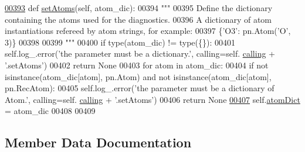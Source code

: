 \begin{DoxyCode}
\hypertarget{classpyneb_1_1core_1_1diags_1_1_diagnostics_l00393}{}\hyperlink{classpyneb_1_1core_1_1diags_1_1_diagnostics_a01ad01e336115e86eada60350060bb9b}{00393}     \textcolor{keyword}{def }\hyperlink{classpyneb_1_1core_1_1diags_1_1_diagnostics_a01ad01e336115e86eada60350060bb9b}{setAtoms}(self, atom\_dic):
00394         \textcolor{stringliteral}{"""}
00395 \textcolor{stringliteral}{        Define the dictionary containing the atoms used for the diagnostics.}
00396 \textcolor{stringliteral}{        A dictionary of atom instantiations refereed by atom strings, for example:}
00397 \textcolor{stringliteral}{        \{'O3': pn.Atom('O', 3)\}}
00398 \textcolor{stringliteral}{        }
00399 \textcolor{stringliteral}{        """}
00400         \textcolor{keywordflow}{if} type(atom\_dic) != type(\{\}):
00401             self.log\_.error(\textcolor{stringliteral}{'the parameter must be a dictionary.'}, calling=self.
      \hyperlink{classpyneb_1_1core_1_1diags_1_1_diagnostics_a07dce673fec8b2383ef411ab94b0b2fe}{calling} + \textcolor{stringliteral}{'.setAtoms'})
00402             \textcolor{keywordflow}{return} \textcolor{keywordtype}{None}
00403         \textcolor{keywordflow}{for} atom \textcolor{keywordflow}{in} atom\_dic:
00404             \textcolor{keywordflow}{if} \textcolor{keywordflow}{not} isinstance(atom\_dic[atom], pn.Atom) \textcolor{keywordflow}{and} \textcolor{keywordflow}{not} isinstance(atom\_dic[atom], pn.RecAtom):
00405                 self.log\_.error(\textcolor{stringliteral}{'the parameter must be a dictionary of Atom.'}, calling=self.
      \hyperlink{classpyneb_1_1core_1_1diags_1_1_diagnostics_a07dce673fec8b2383ef411ab94b0b2fe}{calling} + \textcolor{stringliteral}{'.setAtoms'})
00406                 \textcolor{keywordflow}{return} \textcolor{keywordtype}{None}
\hypertarget{classpyneb_1_1core_1_1diags_1_1_diagnostics_l00407}{}\hyperlink{classpyneb_1_1core_1_1diags_1_1_diagnostics_a36301f268745b33abe6cfeb3e41a6356}{00407}         self.\hyperlink{classpyneb_1_1core_1_1diags_1_1_diagnostics_a36301f268745b33abe6cfeb3e41a6356}{atomDict} = atom\_dic
00408     
00409     
\end{DoxyCode}


\subsection{Member Data Documentation}
\hypertarget{classpyneb_1_1core_1_1diags_1_1_diagnostics_a36301f268745b33abe6cfeb3e41a6356}{}
